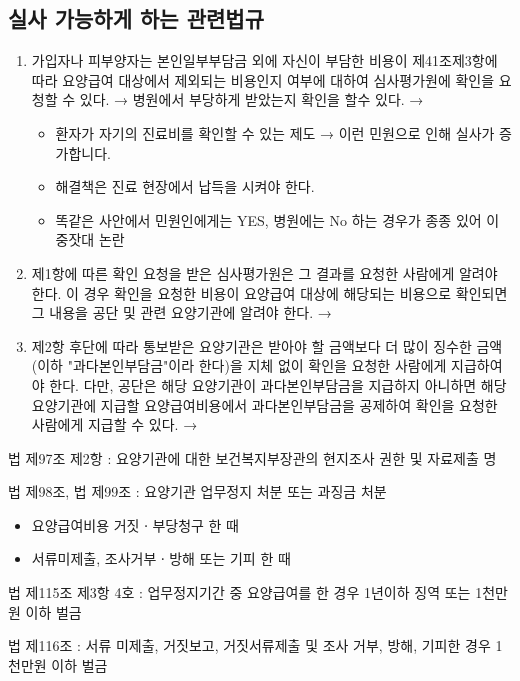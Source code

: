 \subsection{실사 가능하게 하는 관련법규}
\begin{enumerate}[①]\tightlist
\item 가입자나 피부양자는 본인일부부담금 외에 자신이 부담한 비용이 제41조제3항에 따라 요양급여 대상에서 제외되는 비용인지 여부에 대하여 심사평가원에 확인을 요청할 수 있다. → 병원에서 부당하게 받았는지 확인을 할수 있다. → 
	\begin{itemize}\tightlist
	\item 환자가 자기의 진료비를 확인할 수 있는 제도 → 이런 민원으로 인해 실사가 증가합니다.
	\item 해결책은 진료 현장에서 납득을 시켜야 한다.
	\item 똑같은 사안에서 민원인에게는 YES, 병원에는 No 하는 경우가 종종 있어 이중잣대 논란
	\end{itemize}
\item 제1항에 따른 확인 요청을 받은 심사평가원은 그 결과를 요청한 사람에게 알려야 한다. 이 경우 확인을 요청한 비용이 요양급여 대상에 해당되는 비용으로 확인되면 그 내용을 공단 및 관련 요양기관에 알려야 한다. → 
\item 제2항 후단에 따라 통보받은 요양기관은 받아야 할 금액보다 더 많이 징수한 금액(이하 "과다본인부담금"이라 한다)을 지체 없이 확인을 요청한 사람에게 지급하여야 한다. 다만, 공단은 해당 요양기관이 과다본인부담금을 지급하지 아니하면 해당 요양기관에 지급할 요양급여비용에서 과다본인부담금을 공제하여 확인을 요청한 사람에게 지급할 수 있다. → 
\end{enumerate}

\begin{description}\tightlist
\item[현지조사] 법 제97조 제2항 : 요양기관에 대한 보건복지부장관의 현지조사 권한 및 자료제출 명
\item[형정처분] 법 제98조, 법 제99조 : 요양기관 업무정지 처분 또는 과징금 처분
	\begin{itemize}\tightlist
	\item 요양급여비용 거짓ㆍ부당청구 한 때
	\item 서류미제출, 조사거부ㆍ방해 또는 기피 한 때
	\end{itemize}
\item[형사고발] 법 제115조 제3항 4호 : 업무정지기간 중 요양급여를 한 경우 1년이하 징역 또는 1천만원 이하 벌금
\item[형사고발] 법 제116조 : 서류 미제출, 거짓보고, 거짓서류제출 및 조사 거부, 방해, 기피한 경우 1천만원 이하 벌금
\end{description}

